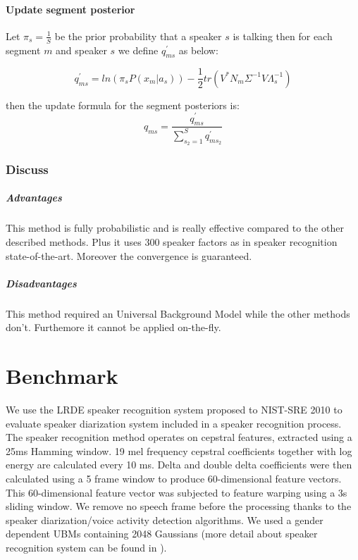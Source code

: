 \documentclass{techrep} %
\begin{document}
\subsubsection{Update segment posterior}
Let $\pi_s = \frac{1}{S}$ be the prior probability that a speaker $s$
is talking then for each segment $m$ and speaker $s$ we define
$q_{ms}^{'}$ as below:

$$q_{ms}^{'} = ln(\pi_sP(x_m|a_s)) - \frac{1}{2}tr(V^*N_m\Sigma^{-1}V\Lambda_s^{-1})$$

then the update formula for the segment posteriors is:
$$q_{ms} = \frac{q_{ms}^{'}}{\sum_{s_2=1}^{S}{q_{ms_2}^{'}}}$$%
\subsection{Discuss}
\paragraph{Advantages} This method is fully probabilistic and is really effective compared to the other described methods. Plus it uses 300 speaker factors as in speaker recognition state-of-the-art. Moreover the convergence is guaranteed.

\paragraph{Disadvantages} This method required an Universal Background Model while the other methods don't. Furthemore it cannot be applied on-the-fly.
\chapter{Benchmark}

We use the LRDE speaker recognition system proposed to NIST-SRE 2010
to evaluate speaker diarization system included in a speaker
recognition process. The speaker recognition method operates on
cepstral features, extracted using a 25ms Hamming window. 19 mel
frequency cepstral coefficients together with log energy are
calculated every 10 ms. Delta and double delta coefficients were then
calculated using a 5 frame window to produce 60-dimensional feature
vectors. This 60-dimensional feature vector was subjected to feature
warping using a 3s sliding window. We remove no speech frame before
the processing thanks to the speaker diarization/voice activity
detection algorithms. We used a gender dependent UBMs containing 2048
Gaussians (more detail about speaker recognition system can be found
in \cite{dehak.icassp.2011}).\\
\end{document}
